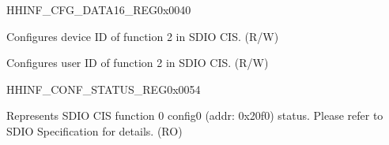 \begin{register}{H}{HINF\_CFG\_DATA16\_REG}{0x0040}\label{regdesc:HINFCFGDATA16REG}
%
%
\regnewline%
\begin{regdesc}\begin{reglist}
\label{fielddesc:HINFDEVICEIDFN2}\item [HINF\_DEVICE\_ID\_FN2] Configures device ID of function 2 in SDIO CIS. (R/W)
\label{fielddesc:HINFUSERIDFN2}\item [HINF\_USER\_ID\_FN2] Configures user ID of function 2 in SDIO CIS. (R/W)
\end{reglist}\end{regdesc}
\end{register}


\begin{register}{H}{HINF\_CONF\_STATUS\_REG}{0x0054}\label{regdesc:HINFCONFSTATUSREG}
%
%
\regnewline%
\begin{regdesc}\begin{reglist}
\label{fielddesc:HINFFUNC0CONFIG0}\item [HINF\_FUNC0\_CONFIG0] Represents SDIO CIS function 0 config0 (addr: 0x20f0) status. Please refer to SDIO Specification for details. (RO)
\end{reglist}\end{regdesc}
\end{register}


